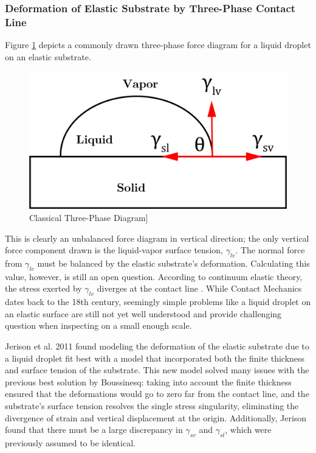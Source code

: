 \subsubsection{Deformation of Elastic Substrate by Three-Phase Contact Line}
Figure \ref{fig:three-phase} depicts a commonly drawn three-phase force diagram for a liquid droplet on an elastic substrate.
\begin{figure}[h!]
	\centering
	\includegraphics[width=.6\textwidth]{Chapters/Figures/phase_diagram.PNG}
	\caption[Three-Phase Diagram]{Classical Three-Phase Diagram]}
	\label{fig:three-phase} 
\end{figure}


This is clearly an unbalanced force diagram in vertical direction; the only vertical force component drawn is the liquid-vapor surface tension, $ \gamma_{lv} $. The normal force from $\gamma_{lv}$ must be balanced by the elastic substrate's deformation. Calculating this value, however, is still an open question. According to continuum elastic theory, the stress exerted by $\gamma_{lv}$ diverges at the contact line \cite{jerison2011deformation}. While Contact Mechanics dates back to the 18th century, seemingly simple problems like a liquid droplet on an elastic surface are still not yet well understood and provide challenging question when inspecting on a small enough scale.

Jerison et al. 2011 \cite{jerison2011deformation} found modeling the deformation of the elastic substrate due to a liquid droplet fit best with a model that incorporated both the finite thickness and surface tension of the substrate. This new model solved many issues with the previous best solution by Boussinesq: taking into account the finite thickness ensured that the deformations would go to zero far from the contact line, and the substrate's surface tension resolves the single stress singularity, eliminating the divergence of strain and vertical displacement at the origin. Additionally, Jerison found that there must be a large discrepancy in $\gamma_{sv}$ and $\gamma_{sl}$, which were previously assumed to be identical.


